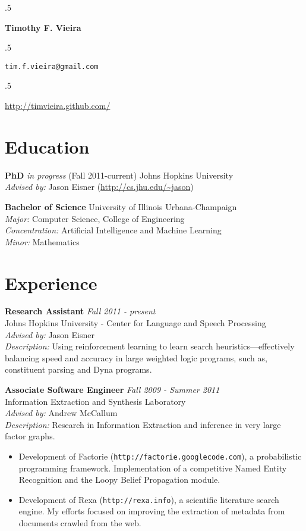\documentclass{report}
\newcommand{\centerheader}[1]{\moveleft.5\hoffset\centerline{#1}}
\begin{document}
{\vskip 0.1in}

{
  {\vskip 0.2in}
  \centerheader{\Large \bf Timothy F. Vieira}
  {\par
    {\vskip 0.1in}
    \centerheader{\texttt{tim.f.vieira@gmail.com}}
    \centerheader{\url{http://timvieira.github.com/}}
  }
  {\vskip 0.1in}
}
{\vskip -0.20in}


\section*{Education}
{\bf PhD} \emph{in progress} (Fall 2011-current) Johns Hopkins University \\
{\sl Advised by:} Jason Eisner (\url{http://cs.jhu.edu/~jason})

{\bf Bachelor of Science} University of Illinois Urbana-Champaign \\
{\sl Major:} Computer Science, College of Engineering \\
{\sl Concentration:} Artificial Intelligence and Machine Learning \\
{\sl Minor:} Mathematics

\section*{Experience}
{\bf Research Assistant} \hfill {\it Fall 2011 - present} \\ Johns Hopkins
University - Center for Language and Speech Processing \\ {\sl Advised by:}
Jason Eisner \\ {\sl Description:} Using reinforcement learning to learn search
heuristics---effectively balancing speed and accuracy in large weighted logic
programs, such as, constituent parsing and Dyna programs.

{\bf Associate Software Engineer} \hfill {\it Fall 2009 - Summer 2011} \\
Information Extraction and Synthesis Laboratory \\
{\sl Advised by:} Andrew McCallum \\
{\sl Description:} Research in Information Extraction and inference in very large factor graphs.
\begin{itemize}
\item Development of Factorie (\texttt{http://factorie.googlecode.com}), a probabilistic programming framework. Implementation of a competitive Named Entity Recognition and the Loopy Belief Propagation module.
\item Development of Rexa (\texttt{http://rexa.info}), a scientific literature search engine. My efforts focused on improving the extraction of metadata from documents crawled from the web.
\end{itemize}
\end{document}
